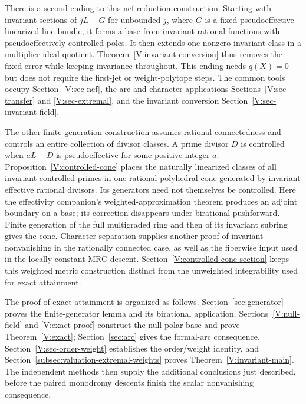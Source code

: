 There is a second ending to this nef-reduction construction.  Starting
with invariant sections of $jL-G$ for unbounded $j$, where $G$ is a
fixed pseudoeffective linearized line bundle, it forms a base from
invariant rational functions with pseudoeffectively controlled poles.
It then extends one nonzero invariant class in a multiplier-ideal
quotient.  Theorem~\ref{V:invariant-conversion} thus removes the fixed
error while keeping invariance throughout.  This ending needs
$q(X)=0$ but does not require the first-jet or weight-polytope steps.
The common tools occupy Section~\ref{V:sec-nef}, the arc and character
applications Sections~\ref{V:sec-transfer} and \ref{V:sec-extremal},
and the invariant conversion Section~\ref{V:sec-invariant-field}.

The other finite-generation construction assumes rational
connectedness and controls an entire collection of divisor classes.
A prime divisor $D$ is controlled when $aL-D$ is pseudoeffective for
some positive integer $a$.  Proposition~\ref{V:controlled-cone} places
the naturally linearized classes of all invariant controlled primes
in one rational polyhedral cone generated by invariant effective
rational divisors.  Its generators need not themselves be controlled.
Here the effectivity companion's weighted-approximation theorem
produces an adjoint boundary on a base; its correction disappears
under birational pushforward.  Finite generation of the full
multigraded ring and then of its invariant subring gives the cone.
Character separation supplies another proof of invariant nonvanishing
in the rationally connected case, as well as the fiberwise input used
in the locally constant MRC descent.  Section~\ref{V:controlled-cone-section}
keeps this weighted metric construction distinct from the unweighted
integrability used for exact attainment.

The proof of exact attainment is organized as follows.
Section~\ref{sec:generator} proves the finite-generator lemma and its
birational application.  Sections~\ref{V:null-field} and
\ref{V:exact-proof} construct the null-polar base and prove
Theorem~\ref{V:exact}; Section~\ref{sec:arc} gives the formal-arc
consequence.  Section~\ref{V:sec-order-weight} establishes the
order/weight identity, and Section~\ref{subsec:valuation-extremal-weights}
proves Theorem~\ref{V:invariant-main}.  The independent methods then
supply the additional conclusions just described, before the paired
monodromy descents finish the scalar nonvanishing consequence.
